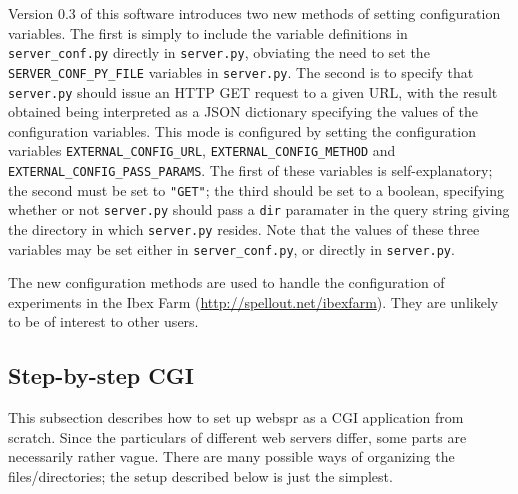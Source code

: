 \documentclass[
]{article}
\begin{document}
Version 0.3 of this software introduces two new methods of setting
configuration variables. The first is simply to include the variable
definitions in \texttt{server\_conf.py} directly in \texttt{server.py},
obviating the need to set the \texttt{SERVER\_CONF\_PY\_FILE} variables
in \texttt{server.py}. The second is to specify that \texttt{server.py}
should issue an HTTP GET request to a given URL, with the result
obtained being interpreted as a JSON dictionary specifying the values of
the configuration variables. This mode is configured by setting the
configuration variables \texttt{EXTERNAL\_CONFIG\_URL},
\texttt{EXTERNAL\_CONFIG\_METHOD} and
\texttt{EXTERNAL\_CONFIG\_PASS\_PARAMS}. The first of these variables is
self-explanatory; the second must be set to \texttt{"GET"}; the third
should be set to a boolean, specifying whether or not \texttt{server.py}
should pass a \texttt{dir} paramater in the query string giving the
directory in which \texttt{server.py} resides. Note that the values of
these three variables may be set either in \texttt{server\_conf.py}, or
directly in \texttt{server.py}.

The new configuration methods are used to handle the configuration of
experiments in the Ibex Farm (\url{http://spellout.net/ibexfarm}). They
are unlikely to be of interest to other users.

\hypertarget{step-by-step-cgi}{%
\subsection{Step-by-step CGI}\label{step-by-step-cgi}}

This subsection describes how to set up webspr as a CGI application from
scratch. Since the particulars of different web servers differ, some
parts are necessarily rather vague. There are many possible ways of
organizing the files/directories; the setup described below is just the
simplest.
\end{document}
